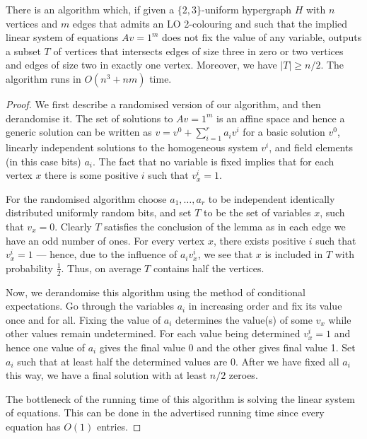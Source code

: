 \documentclass[10pt,a4paper]{amsart}
\begin{document}
\begin{lemma}\label{lem:innerstep}
    There is an algorithm which, if given a $\{2, 3\}$-uniform hypergraph $H$ with $n$ vertices and
    $m$ edges that admits an LO 2-colouring and such that the implied linear
    system of equations $Av=1^m$ does not fix the value of any variable, outputs a subset $T$ of vertices that intersects edges of size three in zero or two vertices and edges of size two in exactly one vertex.
    Moreover, we have  $\vert T\vert \geq n / 2$. The algorithm runs in $O(n^3 + nm)$ time.
\end{lemma}

\begin{proof}

    We first describe a randomised version of our algorithm, and then derandomise
    it. The set of solutions to $Av=1^m$ is an affine space and hence a generic solution can be written as $v=v^0+\sum_{i=1}^r a_i v^i$ for a basic solution $v^0$, linearly independent solutions to the homogeneous system $v^i$, and field elements (in this case bits) $a_i$.
    The fact that no variable is fixed implies that for each vertex $x$ there is 
    some positive $i$ such that $v^i_x=1$.
    
     For the randomised algorithm choose $a_1, \ldots, a_r$ to be independent identically distributed uniformly random bits, and set $T$ to be 
     the set of variables $x$, such that $v_x=0$.  Clearly $T$ satisfies
     the conclusion of the lemma as in each edge we have an odd number of ones. 
     For every vertex $x$, there exists positive $i$ such that $v_x^i = 1$ --- hence, due to the influence of $a_i v_x^i$, we see that $x$ is included in $T$ with probability $\frac{1}{2}$.
     Thus, on average $T$ contains half the vertices.

    Now, we derandomise this algorithm using the method of conditional
    expectations. Go through the variables $a_i$ in increasing order and 
    fix its value once and for all.  Fixing the value of $a_i$ determines
    the value(s) of some $v_x$ while other values remain undetermined.  For each
    value being determined $v_x^i=1$ and hence one value of $a_i$ gives
    the final value 0 and the other gives final value 1.  Set $a_i$ such
    that at least half the determined values are 0.  After we have 
    fixed all $a_i$ this way, we have a final solution with at least
    $n/2$ zeroes.
    
    The bottleneck of the running time of this algorithm is solving the linear system of equations. This can be done in the advertised running time since every equation has $O(1)$ entries. 
\end{proof}
\end{document}
